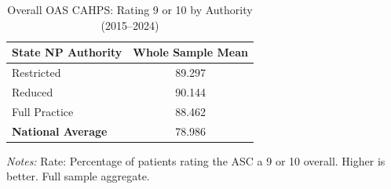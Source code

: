 \begin{table}[htbp]
    \centering
    \caption{Overall OAS CAHPS: Rating 9 or 10 by Authority (2015--2024)}
    \label{tab:oas_rating_9_10_full}
    \vspace{0.2cm}
    \begin{tabular}{lc}
        \toprule
        \textbf{State NP Authority} & \textbf{Whole Sample Mean} \\
        \midrule
        Restricted & 89.297 \\
        Reduced & 90.144 \\
        Full Practice & 88.462 \\
        \midrule
        \textbf{National Average} & 78.986 \\
        \bottomrule
    \end{tabular}
    \vspace{0.1cm}
    \begin{minipage}{0.6\textwidth}
        \footnotesize \textit{Notes:} Rate: Percentage of patients rating the ASC a 9 or 10 overall. Higher is better. Full sample aggregate.
    \end{minipage}
\end{table}